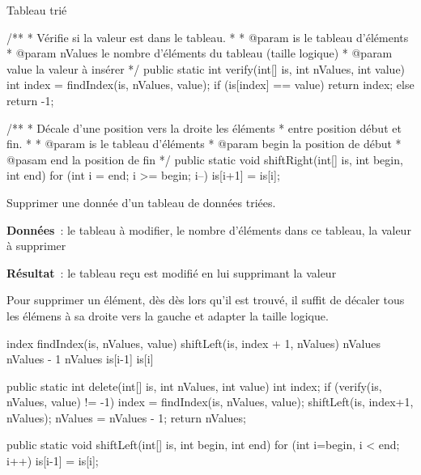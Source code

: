 \begin{Fiche}{Tableau trié}
\begin{java}
/**
 * Vérifie si la valeur est dans le tableau. 
 *
 * @param is le tableau d'éléments
 * @param nValues le nombre d'éléments du tableau (taille logique)
 * @param value la valeur à insérer
 */
public static int verify(int[] is, int nValues, int value){
	int index = findIndex(is, nValues, value);
	if (is[index] == value) {
		return index;
	} else {
		return -1;
	}
}

/**
 * Décale d'une position vers la droite les éléments 
 * entre position début et fin. 
 * 
 * @param is le tableau d'éléments
 * @param begin la position de début
 * @pasam end la position de fin
 */
public static void shiftRight(int[] is, int begin, int end){
	for (int i = end; i >= begin; i--){
		is[i+1] = is[i];
	}
}
	\end{java}

\clearpage
{}


	Supprimer une donnée d'un tableau de données triées.
	
	\textbf{Données}~: le tableau à modifier, le nombre d'éléments dans ce
	tableau, la valeur à supprimer
		
	\textbf{Résultat}~: le tableau reçu est modifié en lui supprimant la valeur
		

	Pour supprimer un élément, dès dès lors qu'il est trouvé, il suffit de décaler tous les élémens à sa droite vers la gauche et adapter la taille logique. 

	\begin{pseudocode}
				\Stmt index \Gets findIndex(is, nValues, value)
				\Stmt shiftLeft(is, index + 1, nValues)
				\Let nValues \Gets nValues - 1	
			\EndIf
			\Return nValues
		\EndAlgo
		\Empty
				\Let is[i-1] \Gets is[i]
			\EndFor
		\EndAlgo
	\end{pseudocode}

	\begin{java}
public static int delete(int[] is, int nValues, int value){
	int index;
	if (verify(is, nValues, value) != -1){
		index = findIndex(is, nValues, value);
		shiftLeft(is, index+1, nValues);
		nValues = nValues - 1;
	}
	return nValues;
}

public static void shiftLeft(int[] is, int begin, int end){
	for (int i=begin, i < end; i++){
		is[i-1] = is[i];
	}
}
	\end{java}

\end{Fiche}
